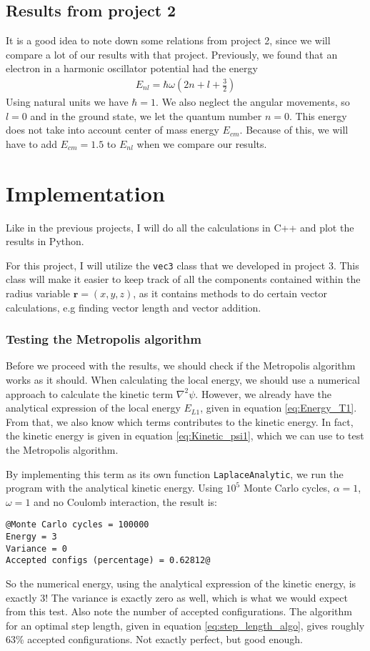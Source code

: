 \documentclass[12pt]{article}
\begin{document}
\subsection*{Results from project 2}
It is a good idea to note down some relations from project 2, since we will compare a lot of our results with that project. Previously, we found that an electron in a harmonic oscillator potential had the energy
\begin{align*}
E_{nl} = \hbar \omega \left(2n + l + \frac{3}{2} \right)
\end{align*}
Using natural units we have $\hbar = 1$. We also neglect the angular movements, so $l = 0$ and in the ground state, we let the quantum number $n=0$. This energy does not take into account center of mass energy $E_{cm}$. Because of this, we will have to add $E_{cm} = 1.5$ to $E_{nl}$ when we compare our results.
\section{Implementation} \label{section:implement}
Like in the previous projects, I will do all the calculations in C++ and plot the results in Python.

For this project, I will utilize the \texttt{vec3} class that we developed in project 3. This class will make it easier to keep track of all the components contained within the radius variable $\mathbf{r} = (x, y, z)$, as it contains methods to do certain vector calculations, e.g finding vector length and vector addition. 
\subsubsection*{Testing the Metropolis algorithm}
Before we proceed with the results, we should check if the Metropolis algorithm works as it should. When calculating the local energy, we should use a numerical approach to calculate the kinetic term $\nabla^2\psi$. However, we already have the analytical expression of the local energy $E_{L1}$, given in equation \ref{eq:Energy_T1}. From that, we also know which terms contributes to the kinetic energy. In fact, the kinetic energy is given in equation \ref{eq:Kinetic_psi1}, which we can use to test the Metropolis algorithm.

By implementing this term as its own function \texttt{LaplaceAnalytic}, we run the program with the analytical kinetic energy. Using $10^5$ Monte Carlo cycles, $\alpha = 1$, $\omega = 1$ and no Coulomb interaction, the result is:
\begin{lstlisting}
@Monte Carlo cycles = 100000
Energy = 3
Variance = 0
Accepted configs (percentage) = 0.62812@
\end{lstlisting}
So the numerical energy, using the analytical expression of the kinetic energy, is exactly 3! The variance is exactly zero as well, which is what we would expect from this test. Also note the number of accepted configurations. The algorithm for an optimal step length, given in equation \ref{eq:step_length_algo}, gives roughly 63\% accepted configurations. Not exactly perfect, but good enough.
\end{document}
